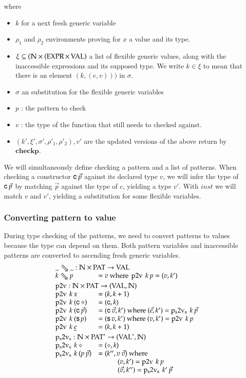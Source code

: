 where
\begin{itemize}
\item
$k$ for a next fresh generic variable
\item
$\rho_1$ and $\rho_2$ environments proving for $x$ a value and its type.
\item
$\xi \subseteq (\mathbb{N} \times (\operatorname{EXPR} \times \operatorname{VAL})$ a list of flexible generic values, along with the inaccessible expressions and its supposed type. We write $k \in \xi$ to mean that there is an element $(k,(e,v)))$ in $\sigma$. 
\item
$\sigma$ an substitution for the flexible generic variables
\item
$p$ : the pattern to check
\item
$v$ : the type of the function that still needs to checked against.
\item
$(k',\xi',\sigma',\rho'_1,\rho'_2),v'$ are the updated versions of the above return by $\mathbf{checkp}$.
\end{itemize}

We will simultaneously define checking a pattern and a list of patterns.
When checking a constructor $\mathsf{c} \: \vec{p}$ against its declared type $v$,
we will infer the type of $\mathsf{c} \: \vec{p}$ by matching $\vec{p}$ against the type of $c$,
yielding a type $v'$. With $inst$ we will match $v$ and $v'$, yielding a substitution for some flexible variables.

\subsubsection{Converting pattern to value}
During type checking of the patterns, we need to convert patterns to values because the type can depend on them.
Both pattern variables and inaccessible patterns are converted to ascending fresh generic variables.
\[
\begin{array}{ll}

\multicolumn{2}{l}{\ptv{\_}{\_}: \cN \times \Pat \ra \Val}\\
\ptv{k}{p} & = v \mbox{ where } \ptvx \: k \: p = (v,k')
\vs\\ 
\multicolumn{2}{l}{\ptvx : \cN \times \Pat \ra (\Val,\cN)}\\
\ptvx \: k \:x & = (k,k+1) \\
\ptvx \: k \: (\cc \: \diamond) & = (\cc,k) \\
\ptvx \: k \: (\cc \: \vec{p}) & = (\cc \: \vec{v},k') \mbox{ where } (\vec{e},k') = \pstvs \: k \: \vec{p}\\
\ptvx \: k \: (\s p) & = (\s v,k') \mbox{ where } (v,k') = \ptvx \: k \: p\\
\ptvx \: k \: \inacc{e} & = (k,k+1) 
\vs\\
\multicolumn{2}{l}{\pstvs : \cN \times \ves{\Pat} \ra (\ves{\Val},\cN)}\\
\pstvs \: k \: \diamond & = (\diamond,k) \\
\pstvs \: k \: (p \: \vec{p}) & = (k'', v \: \vec{v}) \mbox{ where } \\
& \spcx (v,k') = \ptvx \: k \: p \\
& \spcx (\vec{v},k'') = \pstvs \: k' \: \vec{p}  
\end{array}
\]

